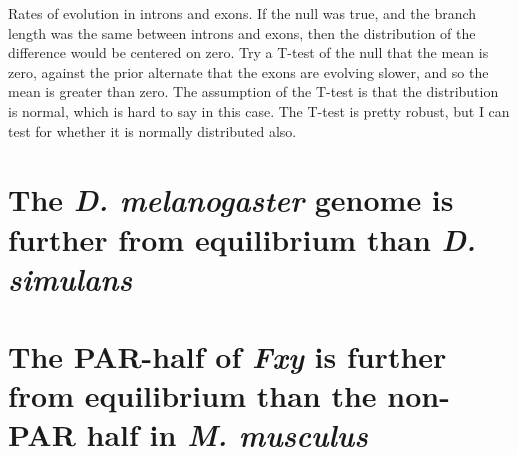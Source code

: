Rates of evolution in introns and exons. If the null was true, and the branch length was the same between introns and exons, then the distribution of the difference would be centered on zero. Try a T-test of the null that the mean is zero, against the prior alternate that the exons are evolving slower, and so the mean is greater than zero. The assumption of the T-test is that the distribution is normal, which is hard to say in this case. The T-test is pretty robust, but I can test for whether it is normally distributed also. 


\section{The \textit{D. melanogaster} genome is further from equilibrium than \textit{D. simulans}}





 
\section{The PAR-half of \textit{Fxy} is further from equilibrium than the non-PAR half in \textit{M. musculus}}